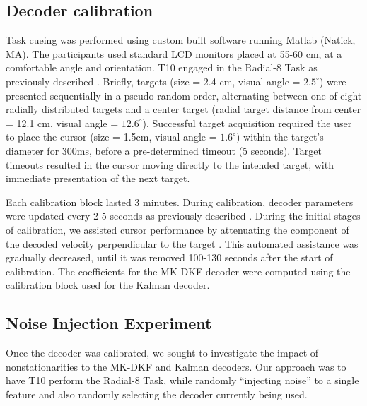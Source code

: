 \subsection{Decoder calibration}

Task cueing was performed using custom built software running Matlab (Natick, MA). The participants used standard LCD monitors placed at 55-60 cm, at a comfortable angle and orientation. T10 engaged in the Radial-8 Task as previously described \cite{Jarosiewicz2013, Jarosiewicz2015, Bacher2015, Brandman2018}. Briefly, targets (size = 2.4 cm, visual angle = $2.5^\circ$) were presented sequentially in a pseudo-random order, alternating between one of eight radially distributed targets and a center target (radial target distance from center = 12.1 cm, visual angle = $12.6^\circ$). Successful target acquisition required the user to place the cursor (size = 1.5cm, visual angle = $1.6^\circ$) within the target's diameter for 300ms, before a pre-determined timeout (5 seconds). Target timeouts resulted in the cursor moving directly to the intended target, with immediate presentation of the next target. 

Each calibration block lasted 3 minutes. During calibration, decoder parameters were updated every 2-5 seconds as previously described \cite{Brandman2018}. During the initial stages of calibration, we assisted cursor performance by attenuating the component of the decoded velocity perpendicular to the target \cite{Jarosiewicz2013, Velliste2008}. This automated assistance was gradually decreased, until it was removed 100-130 seconds after the start of calibration. The coefficients for the MK-DKF decoder were computed using the calibration block used for the Kalman decoder. 

\subsection{Noise Injection Experiment} 

Once the decoder was calibrated, we sought to investigate the impact of nonstationarities to the MK-DKF and Kalman decoders. Our approach was to have T10 perform the Radial-8 Task, while randomly ``injecting noise'' to a single feature and also randomly selecting the decoder currently being used. 

